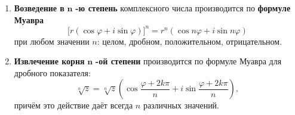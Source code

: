 \begin{enumerate}
\item
  \textbf{Возведение в} $\mathbf{n}$ \textbf{-ю степень} комплексного
    числа производится по \textbf{формуле Муавра}
    \begin{equation*}
        \lbrack r(\cos\varphi + i\sin\varphi)\rbrack^{n} = r^{n}(\cos n\varphi + i\sin n\varphi)
    \end{equation*}
    при любом значении $n$: целом, дробном, положительном, отрицательном.
\item
    \textbf{Извлечение корня} $\mathbf{n}$ \textbf{-ой степени}
    производится по формуле Муавра для дробного показателя:
    \begin{equation*}
        \sqrt[n]{z} = \sqrt[n]{z}\left( \cos\frac{\varphi + 2k\pi}{n} + i\sin\frac{\varphi + 2k\pi}{n} \right),
    \end{equation*}
    причём это действие даёт всегда $n$ различных значений.
\end{enumerate}
